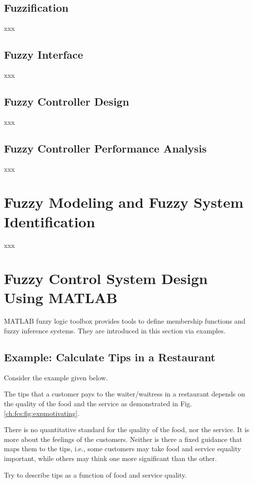 \subsection{Fuzzification}

xxx

\subsection{Fuzzy Interface}

xxx

\subsection{Fuzzy Controller Design}

xxx

\subsection{Fuzzy Controller Performance Analysis}

xxx

\section{Fuzzy Modeling and Fuzzy System Identification}

xxx

\section{Fuzzy Control System Design Using MATLAB}

MATLAB fuzzy logic toolbox provides tools to define membership functions and fuzzy inference systems. They are introduced in this section via examples.

\subsection{Example: Calculate Tips in a Restaurant}

Consider the example given below.

\begin{shortbox}

The tips that a customer pays to the waiter/waitress in a restaurant depends on the quality of the food and the service as demonstrated in Fig. \ref{ch:fcs:fig:expmotivating}.

There is no quantitative standard for the quality of the food, nor the service. It is more about the feelings of the customers. Neither is there a fixed guidance that maps them to the tips, i.e., some customers may take food and service equality important, while others may think one more significant than the other.

Try to describe tips as a function of food and service quality.

\end{shortbox}

